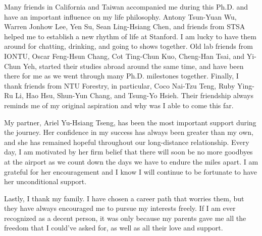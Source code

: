 Many friends in California and Taiwan accompanied me during this Ph.D. and have an important influence on my life philosophy. 
Antony Tsun-Yuan Wu, Warren Jonhow Lee, Yen Su, Sean Ling-Hsiang Chen, and friends from STSA helped me to establish a new rhythm of life at Stanford. I am lucky to have them around for chatting, drinking, and going to shows together.
Old lab friends from IONTU, Oscar Feng-Hsun Chang, Cot Ting-Chun Kuo, Cheng-Han Tsai, and Yi-Chun Yeh, started their studies abroad around the same time, and have been there for me as we went through many Ph.D. milestones together. 
Finally, I thank friends from NTU Forestry, in particular, Coco Nai-Tzu Teng, Ruby Ying-Ru Li, Hao Hsu, Shun-Yun Chang, and Tsung-Yo Hsieh. Their friendship always reminds me of my original aspiration and why was I able to come this far.
\par


My partner, Ariel Yu-Hsiang Tseng, has been the most important support during the journey. Her confidence in my success has always been greater than my own, and she has remained hopeful throughout our long-distance relationship. 
Every day, I am motivated by her firm belief that there will soon be no more goodbyes at the airport as we count down the days we have to endure the miles apart. 
I am grateful for her encouragement and I know I will continue to be fortunate to have her unconditional support.
\par 


Lastly, I thank my family. I have chosen a career path that worries them, but they have always encouraged me to pursue my interests freely. If I am ever recognized as a decent person, it was only because my parents gave me all the freedom that I could've asked for, as well as all their love and support. 
